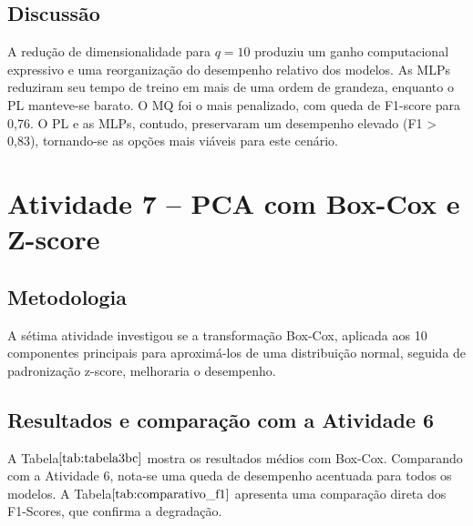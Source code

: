 \documentclass[11pt,a4paper]{article}
\begin{document}
\subsection{Discussão}

A redução de dimensionalidade para \(q=10\) produziu um ganho computacional expressivo e uma reorganização do desempenho relativo dos modelos. As MLPs reduziram seu tempo de treino em mais de uma ordem de grandeza, enquanto o PL manteve-se barato. O MQ foi o mais penalizado, com queda de F1-score para 0,76. O PL e as MLPs, contudo, preservaram um desempenho elevado (F1 > 0,83), tornando-se as opções mais viáveis para este cenário.

\section{Atividade 7 – PCA com Box-Cox e Z-score}

\subsection{Metodologia}

A sétima atividade investigou se a transformação Box-Cox, aplicada aos 10 componentes principais para aproximá-los de uma distribuição normal, seguida de padronização z-score, melhoraria o desempenho.

\subsection{Resultados e comparação com a Atividade 6}

A Tabela\(\ref{tab:tabela3bc}\) mostra os resultados médios com Box-Cox. Comparando com a Atividade 6, nota-se uma queda de desempenho acentuada para todos os modelos. A Tabela\(\ref{tab:comparativo_f1}\) apresenta uma comparação direta dos F1-Scores, que confirma a degradação.

\begin{table}[h!]
  \centering
  \caption{Resultados médios da Atividade 7 (PCA com Box-Cox + z-score).}
  \label{tab:tabela3bc}
\end{table}
\end{document}
